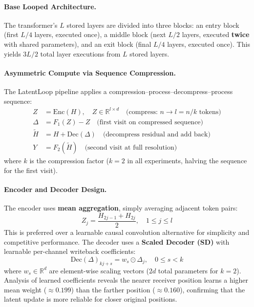 \documentclass[11pt,a4paper]{article}
\begin{document}
\paragraph{Base Looped Architecture.}
The transformer's $L$ stored layers are divided into three blocks: an entry block (first $L/4$ layers, executed once), a middle block (next $L/2$ layers, executed \textbf{twice} with shared parameters), and an exit block (final $L/4$ layers, executed once). This yields $3L/2$ total layer executions from $L$ stored layers.

\paragraph{Asymmetric Compute via Sequence Compression.}
The LatentLoop pipeline applies a compression--process--decompress--process sequence:
\begin{align}
Z &= \mathrm{Enc}(H), \quad Z \in \mathbb{R}^{l \times d} \quad \text{(compress: } n \to l = n/k \text{ tokens)} \label{eq:enc} \\
\Delta &= F_1(Z) - Z \quad \text{(first visit on compressed sequence)} \label{eq:delta} \\
\tilde{H} &= H + \mathrm{Dec}(\Delta) \quad \text{(decompress residual and add back)} \label{eq:dec} \\
Y &= F_2(\tilde{H}) \quad \text{(second visit at full resolution)} \label{eq:full}
\end{align}
where $k$ is the compression factor ($k{=}2$ in all experiments, halving the sequence for the first visit).

\paragraph{Encoder and Decoder Design.}
The encoder uses \textbf{mean aggregation}, simply averaging adjacent token pairs:
\begin{equation}
Z_j = \frac{H_{2j-1} + H_{2j}}{2}, \quad 1 \leq j \leq l
\end{equation}
This is preferred over a learnable causal convolution alternative for simplicity and competitive performance. The decoder uses a \textbf{Scaled Decoder (SD)} with learnable per-channel writeback coefficients:
\begin{equation}
\mathrm{Dec}(\Delta)_{kj+s} = w_s \odot \Delta_j, \quad 0 \leq s < k
\end{equation}
where $w_s \in \mathbb{R}^d$ are element-wise scaling vectors ($2d$ total parameters for $k{=}2$). Analysis of learned coefficients reveals the nearer receiver position learns a higher mean weight ($\approx 0.199$) than the farther position ($\approx 0.160$), confirming that the latent update is more reliable for closer original positions.
\end{document}
